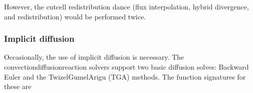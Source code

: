 \documentclass[letterpaper,10pt,english]{sphinxmanual}
\begin{document}
\begin{sphinxVerbatim}[commandchars=\\\{\},formatcom=\scriptsize]
 

    

   
          

       
           
\end{sphinxVerbatim}

However, the cut\sphinxhyphen{}cell redistribution dance (flux interpolation, hybrid divergence, and redistribution) would be performed twice.


\subsubsection{Implicit diffusion}
\label{\detokenize{Solvers/CDR:implicit-diffusion}}\label{\detokenize{Solvers/CDR:chap-implicitdiffusion}}
Occasionally, the use of implicit diffusion is necessary.
The convection\sphinxhyphen{}diffusion\sphinxhyphen{}reaction solvers support two basic diffusion solves:
Backward Euler and the Twizel\sphinxhyphen{}Gumel\sphinxhyphen{}Arigu (TGA) methods.
The function signatures for these are
\end{document}
